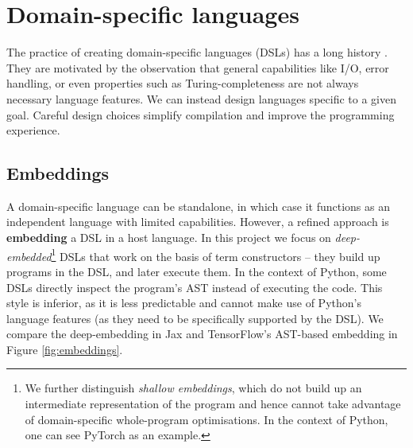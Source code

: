 
\section{Domain-specific languages}
\label{domain-specific-languages}

The practice of creating domain-specific languages (DSLs) has a long history \cite{hudak1996building}. They are motivated by the observation that general capabilities like I/O, error handling, or even properties such as Turing-completeness are not always necessary language features. We can instead design languages specific to a given goal. Careful design choices simplify compilation and improve the programming experience.

\subsection{Embeddings}

A domain-specific language can be standalone, in which case it functions as an independent language with limited capabilities. 
However, a refined approach is \textbf{embedding} a DSL in a host language. 
In this project we focus on \textit{deep-embedded}\footnote{We further distinguish \textit{shallow embeddings}, which do not build up an intermediate representation of the program \cite{gibbons2014folding} and hence cannot take advantage of domain-specific whole-program optimisations. In the context of Python, one can see PyTorch as an example.} DSLs that work on the basis of term constructors -- they build up programs in the DSL, and later execute them. 
In the context of Python, some DSLs directly inspect the program's AST instead of executing the code. 
This style is inferior, as it is less predictable and cannot make use of Python's language features (as they need to be specifically supported by the DSL). 
We compare the deep-embedding in Jax and TensorFlow's AST-based embedding in Figure \ref{fig:embeddings}.

